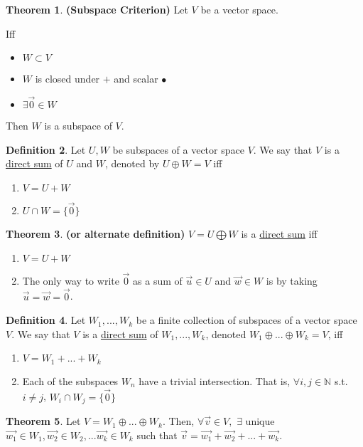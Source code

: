 \documentclass[a5paper]{article}
\theoremstyle{definition}%
\newtheorem{theorem}{Theorem}
\numberwithin{theorem}{section} %
\newtheorem{definition}[theorem]{Definition}
\newcommand{\N}{\mathbb{N}}
\begin{document}
\begin{theorem}
\textbf{(Subspace Criterion)} Let $V$ be a vector space. 

Iff
\begin{itemize}
\item $W \subset V$
\item $W$ is closed under $+$ and scalar $\bullet$ 
\item $\exists \vec{0} \in W$
\end{itemize}

Then $W$ is a subspace of $V$. 
\end{theorem}

\begin{definition}
Let $U, W$ be subspaces of a vector space $V$. We say that $V$ is a \underline{direct sum} of $U$ and $W$, denoted by $U \oplus W = V$ iff
\begin{enumerate}
\item $V = U + W$
\item $U \cap W = \{\vec{0}\}$
\end{enumerate}
\end{definition}

\begin{theorem}
\textbf{(or alternate definition)} $V = U \bigoplus W$ is a \underline{direct sum} iff 
\begin{enumerate}
\item $V = U + W$
\item The only way to write $\vec{0}$ as a sum of $\vec{u} \in U$ and $\vec{w} \in W$ is by taking $\vec{u} = \vec{w} = \vec{0}$. 
\end{enumerate}
\end{theorem}

\begin{definition}
Let $W_1, ... , W_k$ be a finite collection of subspaces of a vector space $V$. We say that $V$ is a \underline{direct sum} of $W_1, ... , W_k$, denoted $W_1 \oplus ... \oplus W_k = V$, iff
\begin{enumerate}
\item $V = W_1 + ... + W_k$
\item Each of the subspaces $W_n$ have a trivial intersection. That is, $\forall i,j \in \N$ s.t. $ i \neq j$, $W_i \cap W_j = \{\vec{0}\}$ 
\end{enumerate}
\end{definition}

\begin{theorem}
Let $V = W_1 \oplus ... \oplus W_k$. Then, $\forall \vec{v} \in V,$ $\exists$ unique $\vec{w_1} \in W_1, \vec{w_2} \in W_2, ... \vec{w_k} \in W_k$ such that 
$\vec{v} = \vec{w_1} + \vec{w_2} + ... + \vec{w_k}$.
\end{theorem}
\end{document}
